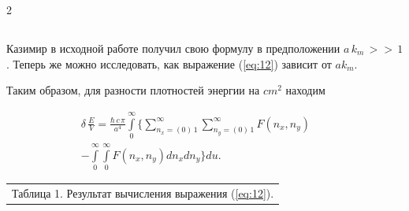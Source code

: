 \documentclass[twoside, 10pt]{article}
\def\myvspacebeforesubsection{-2.0mm}
\def\myvspaceaftersubsection{-2.5mm}
\begin{document}
\begin{multicols}{2}


\vspace{\myvspacebeforesubsection}
    \subsection*{} \label{how-deltaleftevright-depends-on-a-k_m}
\vspace{\myvspaceaftersubsection}


    Казимир в исходной работе \cite{Casimir1948} получил свою формулу в предположении \(a\,k_m\,>>\,1\). Теперь же можно исследовать, как выражение (\ref{eq:12}) зависит от \(a k_m\).


    Таким образом, для разности плотностей энергии на \(cm^2\) находим

\vspace{-3.5mm}
\begin{equation}
\begin{array}{r}
    \delta\,\frac{E}{V} = \frac{\hbar\,c\,\pi}{a^4} \int\limits_{0}^{\infty} \Bigg\{ \sum\limits_{n_x=\left(0\right)\,1}^{\infty} \sum\limits_{n_y=\left(0\right)\,1}^{\infty} F\left(n_x, n_y\right) \,\,\,\,\,\,\,\,\,\,\\ 
- \int\limits_{0}^{\infty} \int\limits_{0}^{\infty} F\left(n_x, n_y\right) d{n_x} d{n_y} \Bigg\} d{u}.
\end{array}
\end{equation}

\vspace{-3.5mm}

\noindent
\begin{center}
\begin{tabular}{ r }
Таблица 1. Результат вычисления выражения (\ref{eq:12}).
\end{tabular}

\vspace{+3.5mm}


\end{center}
\end{multicols}
\end{document}

